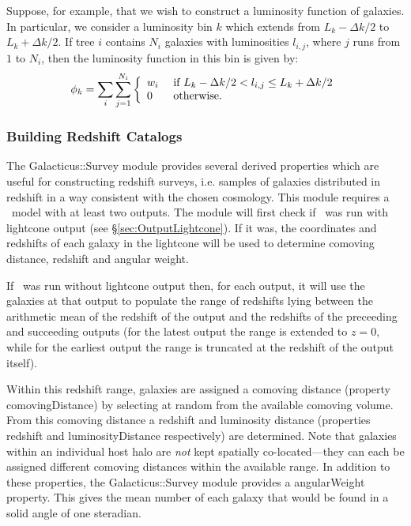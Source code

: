 Suppose, for example, that we wish to construct a luminosity function of galaxies. In particular, we consider a luminosity bin $k$ which extends from $L_k-\Delta k/2$ to $L_k+\Delta k/2$. If tree $i$ contains $N_i$ galaxies with luminosities $l_{i,j}$, where $j$ runs from $1$ to $N_i$, then the luminosity function in this bin is given by:
\begin{equation}
 \phi_k = \sum_i \sum_{j=1}^{N_i} \left\{ \begin{array}{ll} w_i & \hbox{ if  } L_k-\Delta k/2 < l_{i,j} \le L_k+\Delta k/2 \\ 0 & \hbox{ otherwise.} \end{array} \right.
\end{equation}

\subsubsection{Building Redshift Catalogs}\label{sec:Galacticus::Survey}

The {\normalfont \ttfamily Galacticus::Survey} module provides several derived properties which are useful for constructing redshift surveys, i.e. samples of galaxies distributed in redshift in a way consistent with the chosen cosmology. This module requires a \glc\ model with at least two outputs. The module will first check if \glc\ was run with lightcone output (see \S\ref{sec:OutputLightcone}). If it was, the coordinates and redshifts of each galaxy in the lightcone will be used to determine comoving distance, redshift and angular weight.

If \glc\ was run without lightcone output then, for each output, it will use the galaxies at that output to populate the range of redshifts lying between the arithmetic mean of the redshift of the output and the redshifts of the preceeding and succeeding outputs (for the latest output the range is extended to $z=0$, while for the earliest output the range is truncated at the redshift of the output itself).

Within this redshift range, galaxies are assigned a comoving distance (property {\normalfont \ttfamily comovingDistance}) by selecting at random from the available comoving volume. From this comoving distance a redshift and luminosity distance (properties {\normalfont \ttfamily redshift} and {\normalfont \ttfamily luminosityDistance} respectively) are determined. Note that galaxies within an individual host halo are \emph{not} kept spatially co-located---they can each be assigned different comoving distances within the available range. In addition to these properties, the {\normalfont \ttfamily Galacticus::Survey} module provides a {\normalfont \ttfamily angularWeight} property. This gives the mean number of each galaxy that would be found in a solid angle of one steradian.

